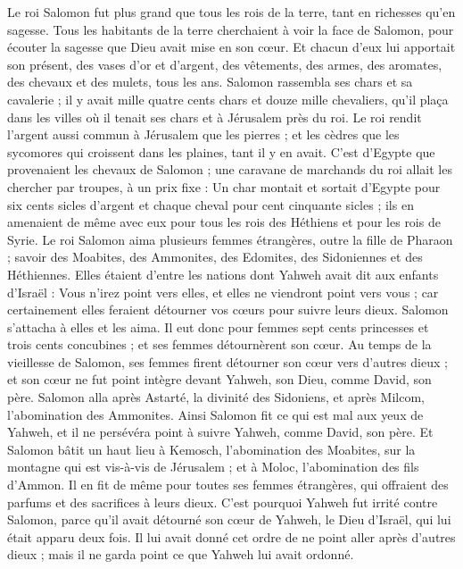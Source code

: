 \begin{multicols}{2}
Le roi Salomon fut plus grand que tous les rois de la terre, tant en richesses qu'en sagesse.
Tous les habitants de la terre cherchaient à voir la face de Salomon, pour écouter la sagesse que Dieu avait mise en son cœur.
Et chacun d'eux lui apportait son présent, des vases d’or et d'argent, des vêtements, des armes, des aromates, des chevaux et des mulets, tous les ans.
Salomon rassembla ses chars et sa cavalerie ; il y avait mille quatre cents chars et douze mille chevaliers, qu'il plaça dans les villes où il tenait ses chars et à Jérusalem près du roi.
Le roi rendit l'argent aussi commun à Jérusalem que les pierres ; et les cèdres que les sycomores qui croissent dans les plaines, tant il y en avait.
C’est d’Egypte que provenaient les chevaux de Salomon ; une caravane de marchands du roi allait les chercher par troupes, à un prix fixe :
Un char montait et sortait d'Egypte pour six cents sicles d'argent et chaque cheval pour cent cinquante sicles ; ils en amenaient de même avec eux pour tous les rois des Héthiens et pour les rois de Syrie.
\VerseOne{}Le roi Salomon aima plusieurs femmes étrangères, outre la fille de Pharaon ; savoir des Moabites, des Ammonites, des Edomites, des Sidoniennes et des Héthiennes.
Elles étaient d'entre les nations dont Yahweh avait dit aux enfants d'Israël : Vous n'irez point vers elles, et elles ne viendront point vers vous ; car certainement elles feraient détourner vos cœurs pour suivre leurs dieux. Salomon s'attacha à elles et les aima.
Il eut donc pour femmes sept cents princesses et trois cents concubines ; et ses femmes détournèrent son cœur.
Au temps de la vieillesse de Salomon, ses femmes firent détourner son cœur vers d'autres dieux ; et son cœur ne fut point intègre devant Yahweh, son Dieu, comme David, son père.
Salomon alla après Astarté, la divinité des Sidoniens, et après Milcom, l'abomination des Ammonites.
Ainsi Salomon fit ce qui est mal aux yeux de Yahweh, et il ne persévéra point à suivre Yahweh, comme David, son père.
Et Salomon bâtit un haut lieu à Kemosch, l'abomination des Moabites, sur la montagne qui est vis-à-vis de Jérusalem ; et à Moloc, l'abomination des fils d’Ammon.
Il en fit de même pour toutes ses femmes étrangères, qui offraient des parfums et des sacrifices à leurs dieux.
C'est pourquoi Yahweh fut irrité contre Salomon, parce qu'il avait détourné son cœur de Yahweh, le Dieu d'Israël, qui lui était apparu deux fois.
Il lui avait donné cet ordre de ne point aller après d'autres dieux ; mais il ne garda point ce que Yahweh lui avait ordonné.

\end{multicols}
